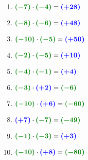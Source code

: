\documentclass[a4paper,12pt]{report}
\begin{document}
\begin{Correction}
\begin{EXO}{}{}
\begin{enumerate}[]
\item $ {\color[HTML]{008002}\boldsymbol{(-7)}} \cdot  {\color[HTML]{008002}\boldsymbol{(-4)}} = {\color{blue}\boldsymbol{(+28)}} $
\item $ {\color[HTML]{008002}\boldsymbol{(-8)}} \cdot  {\color[HTML]{008002}\boldsymbol{(-6)}} = {\color{blue}\boldsymbol{(+48)}} $
\item $ {\color[HTML]{008002}\boldsymbol{(-10)}} \cdot  {\color[HTML]{008002}\boldsymbol{(-5)}} = {\color{blue}\boldsymbol{(+50)}} $
\item $ {\color[HTML]{008002}\boldsymbol{(-2)}} \cdot  {\color[HTML]{008002}\boldsymbol{(-5)}} = {\color{blue}\boldsymbol{(+10)}} $
\item $ {\color[HTML]{008002}\boldsymbol{(-4)}} \cdot  {\color[HTML]{008002}\boldsymbol{(-1)}} = {\color{blue}\boldsymbol{(+4)}} $
\item $ {\color[HTML]{008002}\boldsymbol{(-3)}} \cdot  {\color{blue}\boldsymbol{(+2)}} = {\color[HTML]{008002}\boldsymbol{(-6)}} $
\item $ {\color[HTML]{008002}\boldsymbol{(-10)}} \cdot  {\color{blue}\boldsymbol{(+6)}} = {\color[HTML]{008002}\boldsymbol{(-60)}} $
\item $ {\color{blue}\boldsymbol{(+7)}} \cdot  {\color[HTML]{008002}\boldsymbol{(-7)}} = {\color[HTML]{008002}\boldsymbol{(-49)}} $
\item $ {\color[HTML]{008002}\boldsymbol{(-1)}} \cdot  {\color[HTML]{008002}\boldsymbol{(-3)}} = {\color{blue}\boldsymbol{(+3)}} $
\item $ {\color[HTML]{008002}\boldsymbol{(-10)}} \cdot  {\color{blue}\boldsymbol{(+8)}} = {\color[HTML]{008002}\boldsymbol{(-80)}} $
\end{enumerate}

\end{EXO}

\begin{EXO}{}{}


\end{EXO}
\end{Correction}
\end{document}
